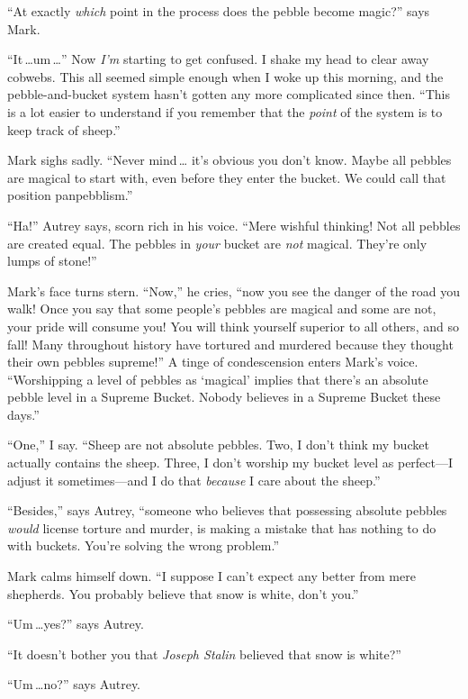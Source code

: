 {
 ``At exactly \textit{which} point in the process
does the pebble become magic?'' says Mark.}

{
 ``It\,\ldots um\,\ldots'' Now
\textit{I'm} starting to get confused. I shake my head
to clear away cobwebs. This all seemed simple enough when I woke up
this morning, and the pebble-and-bucket system hasn't
gotten any more complicated since then. ``This is a
lot easier to understand if you remember that the \textit{point} of the
system is to keep track of sheep.''}

{
 Mark sighs sadly. ``Never mind\,\ldots
it's obvious you don't know. Maybe all
pebbles are magical to start with, even before they enter the bucket.
We could call that position panpebblism.''}

{
 ``Ha!'' Autrey says, scorn rich
in his voice. ``Mere wishful thinking! Not all pebbles
are created equal. The pebbles in \textit{your} bucket are \textit{not}
magical. They're only lumps of
stone!''}

{
 Mark's face turns stern.
``Now,'' he cries,
``now you see the danger of the road you walk! Once
you say that some people's pebbles are magical and some
are not, your pride will consume you! You will think yourself superior
to all others, and so fall! Many throughout history have tortured and
murdered because they thought their own pebbles
supreme!'' A tinge of condescension enters
Mark's voice. ``Worshipping a level of
pebbles as `magical' implies that
there's an absolute pebble level in a Supreme Bucket.
Nobody believes in a Supreme Bucket these days.''}

{
 ``One,'' I say.
``Sheep are not absolute pebbles. Two, I
don't think my bucket actually contains the sheep.
Three, I don't worship my bucket level as perfect---I
adjust it sometimes---and I do that \textit{because} I care about the
sheep.''}

{
 ``Besides,'' says Autrey,
``someone who believes that possessing absolute
pebbles \textit{would} license torture and murder, is making a mistake
that has nothing to do with buckets. You're solving the
wrong problem.''}

{
 Mark calms himself down. ``I suppose I
can't expect any better from mere shepherds. You
probably believe that snow is white, don't
you.''}

{
 ``Um\,\ldots yes?'' says Autrey.}

{
 ``It doesn't bother you that
\textit{Joseph Stalin} believed that snow is
white?''}

{
 ``Um\,\ldots no?'' says Autrey.}


